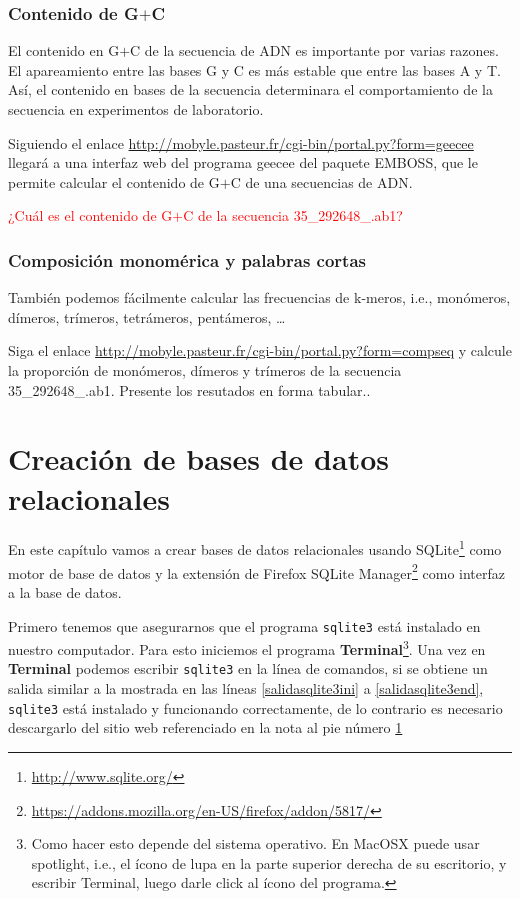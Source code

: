 \documentclass[letter,11pt]{book}
\begin{document}
\subsection{Contenido de G$+$C}

El contenido en G$+$C de la secuencia de ADN es importante por varias razones. El apareamiento entre las bases G y C es más estable que entre las bases A y T. Así, el contenido en bases de la secuencia determinara el comportamiento de la secuencia en experimentos de laboratorio. 

Siguiendo el enlace \url{http://mobyle.pasteur.fr/cgi-bin/portal.py?form=geecee} llegará a una interfaz web del programa geecee del paquete EMBOSS, que le permite calcular el contenido de G$+$C de una secuencias de ADN.

\textcolor{red}{¿Cuál es el contenido de G$+$C de la secuencia 35\_292648\_.ab1?}

\subsection{Composición monomérica y palabras cortas}

También podemos fácilmente calcular las frecuencias de k-meros, i.e., monómeros, dímeros, trímeros, tetrámeros, pentámeros, \ldots

{\color{red}Siga el enlace \url{http://mobyle.pasteur.fr/cgi-bin/portal.py?form=compseq} y calcule la proporción de monómeros, dímeros y trímeros de la secuencia 35\_292648\_.ab1. Presente los resutados en forma tabular.}.

\chapter{Creación de bases de datos relacionales}

En este capítulo vamos a crear bases de datos relacionales usando SQLite\footnote{\url{http://www.sqlite.org/}\label{descargasqlite}} como motor de base de datos y la extensión de Firefox SQLite Manager\footnote{\url{https://addons.mozilla.org/en-US/firefox/addon/5817/}\label{sqllitemanager}} como interfaz a la base de datos.

Primero tenemos que asegurarnos que el programa \Verb+sqlite3+ está instalado en nuestro computador. Para esto iniciemos el programa \textbf{Terminal}\footnote{Como hacer esto depende del sistema operativo. En MacOSX puede usar spotlight, i.e., el ícono de lupa en la parte superior derecha de su escritorio, y escribir Terminal, luego darle click al ícono del programa.}. Una vez en \textbf{Terminal} podemos escribir \Verb+sqlite3+ en la línea de comandos, si se obtiene un salida similar a la mostrada en las líneas \ref{salidasqlite3ini} a \ref{salidasqlite3end}, \Verb+sqlite3+ está instalado y funcionando correctamente, de lo contrario es necesario descargarlo del sitio web referenciado en la nota al pie número \ref{descargasqlite}
\end{document}
